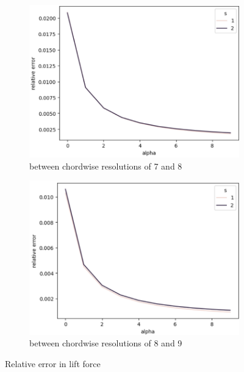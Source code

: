 \begin{figure}[H]
    \begin{subfigure}{0.5\textwidth}
    \includegraphics[width=1.\textwidth]{figures/Optimization/3D/error_chord_7_8.png}
    \caption{between chordwise resolutions of 7 and 8}
    \label{fig:between chordwise resolutions of 7 and 8}
    \end{subfigure}
    \begin{subfigure}{0.5\textwidth}
    \includegraphics[width=1.\textwidth]{figures/Optimization/3D/error_chord_8_9.png}
    \caption{between chordwise resolutions of 8 and 9}
    \label{fig:between chordwise resolutions of 8 and 9}
    \end{subfigure}
    \caption{Relative error in lift force}
\label{fig:Relative error in lift force}
\end{figure}

